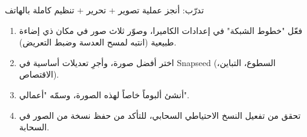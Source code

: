 \begin{tcbpractice}{تدرّب: أنجز عملية تصوير + تحرير + تنظيم كاملة بالهاتف}
\begin{enumerate}
  \item فعّل "خطوط الشبكة" في إعدادات الكاميرا، وصوّر ثلاث صور في مكان ذي إضاءة طبيعية (انتبه لمسح العدسة وضبط التعريض).
  \item اختر أفضل صورة، وأجرِ تعديلات أساسية في Snapseed (السطوع، التباين، الاقتصاص).
  \item أنشئ ألبوماً خاصاً لهذه الصورة، وسمّه "أعمالي".
  \item تحقق من تفعيل النسخ الاحتياطي السحابي، للتأكد من حفظ نسخة من الصور في السحابة.
\end{enumerate}

\end{tcbpractice}
